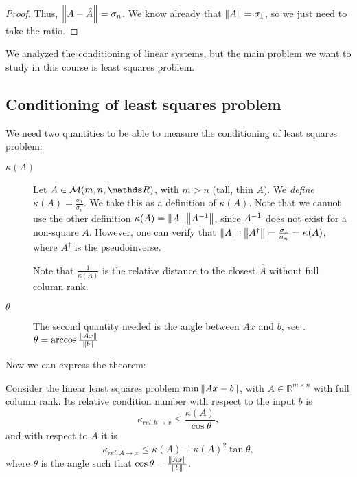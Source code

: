 \documentclass[computationalMathematics.tex]{subfiles}
\begin{document}
\begin{proof}
Thus, $\left\lVert A - \hat{A}\right\rVert = \sigma_n$. We know already that $\left\lVert A\right\rVert=\sigma_1$, so we just need to take the ratio.
\end{proof}


We analyzed the conditioning of linear systems, but the main problem we want to study in this course is least squares problem.

\subsection{Conditioning of least squares problem}

We need two quantities to be able to measure the conditioning of least squares problem:

\begin{description}
  \item[ $\kappa(A)$]
Let $A \in \mathcal{M}(m, n, \R)$, with $m > n$ (tall, thin $A$). We \emph{define} $\kappa(A) = \frac{\sigma_1}{\sigma_n}$. We take this as a definition of $\kappa(A)$. Note that we cannot use the other definition $\kappa(A)=\left\lVert A\right\rVert\left\lVert{A}^{-1}\right\rVert$, since ${A}^{-1}$ does not exist for a non-square $A$. However, one can verify that $\left\lVert A\right\rVert \cdot \left\lVert A^{\dag}\right\rVert = \frac{\sigma_1}{\sigma_n}=\kappa(A)$, where $A^\dag$ is the pseudoinverse.

\begin{obs}
  Note that $\frac{1}{\kappa(A)}$ is the relative distance to the closest $\hat{A}$ without full column rank.
\end{obs}

  \item[ $\theta$]
    The second quantity needed is the angle between $Ax$ and $b$, see .
$\theta = \arccos \frac{\left\lVert Ax\right\rVert}{\left\lVert b\right\rVert}$
\end{description}

Now we can express the theorem:

\begin{theorem}
Consider the linear least squares problem $\min \left\lVert Ax-b\right\rVert$, with $A\in\mathbb{R}^{m\times n}$ with full column rank. Its relative condition number with respect to the input $b$ is
\[
\kappa_{rel, b \to x} \leq \frac{\kappa(A)}{\cos\theta},
\]
and with respect to $A$ it is
\[
  \kappa_{rel, A \to x} \leq \kappa(A) + {\kappa(A)}^2 \tan \theta,
\]
where $\theta$ is the angle such that $\cos \theta = \frac{\left\lVert Ax\right\rVert}{\left\lVert b\right\rVert}$.
\end{theorem}
\end{document}
